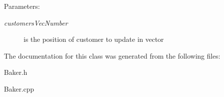 \begin{Desc}
\item[Parameters:]
\begin{description}
\item[{\em customers\-Vec\-Number}]is the position of customer to update in vector \end{description}
\end{Desc}


The documentation for this class was generated from the following files:\begin{CompactItemize}
\item 
Baker.h\item 
Baker.cpp\end{CompactItemize}
